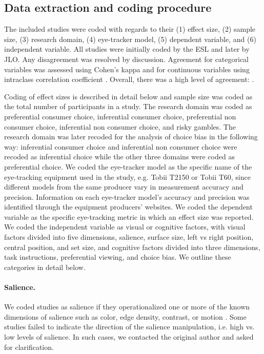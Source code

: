 \documentclass[english,natbib,man,floatsintext]{apa6}
\begin{document}
\subsection{Data extraction and coding procedure}

The included studies were coded with regards to their (1) effect size, (2) sample size, (3) research domain, (4) eye-tracker model, (5) dependent variable, and (6) independent variable. All studies were initially coded by the ESL and later by JLO. Any disagreement was resolved by discussion. Agreement for categorical variables was assessed using Cohen's kappa and for continuous variables using intraclass correlation coefficient \citep{shrout1979a}. Overall, there was a high level of agreement: .

Coding of effect sizes is described in detail below and sample size was coded as the total number of participants in a study. The research domain was coded as preferential consumer choice, inferential consumer choice, preferential non consumer choice, inferential non consumer choice, and risky gambles. The research domain was later recoded for the analysis of choice bias in the following way: inferential consumer choice and inferential non consumer choice were recoded as inferential choice while the other three domains were coded as preferential choice. We coded the eye-tracker model as the specific name of the eye-tracking equipment used in the study, e.g. Tobii T2150 or Tobii T60, since different models from the same producer vary in measurement accuracy and precision. Information on each eye-tracker model's accuracy and precision was identified through the equipment producers' websites. We coded the dependent variable as the specific eye-tracking metric in which an effect size was reported. We coded the independent variable as visual or cognitive factors, with visual factors divided into five dimensions, salience, surface size, left vs right position, central position, and set size, and cognitive factors divided into three dimensions, task instructions, preferential viewing, and choice bias. We outline these categories in detail below. 

\paragraph{Salience.} We coded studies as salience if they operationalized one or more of the known dimensions of salience such as color, edge density, contrast, or motion \citep{itti2000}. Some studies failed to indicate the direction of the salience manipulation, i.e. high vs. low levels of salience. In such cases, we contacted the original author and asked for clarification.
\end{document}
